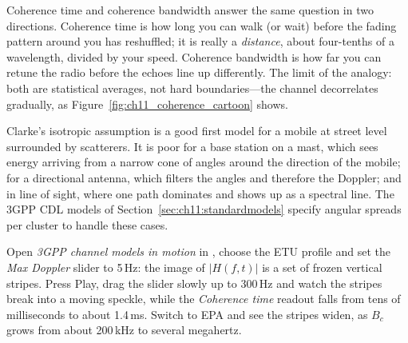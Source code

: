 
\begin{analogy}
Coherence time and coherence bandwidth answer the same question in two directions. Coherence time
is how long you can walk (or wait) before the fading pattern around you has reshuffled; it is
really a \emph{distance}, about four-tenths of a wavelength, divided by your speed. Coherence
bandwidth is how far you can retune the radio before the echoes line up differently. The limit
of the analogy: both are statistical averages, not hard boundaries---the channel decorrelates
gradually, as Figure~\ref{fig:ch11_coherence_cartoon} shows.
\end{analogy}


Clarke's isotropic assumption is a good first model for a mobile at street level surrounded by
scatterers. It is poor for a base station on a mast, which sees energy arriving from a narrow
cone of angles around the direction of the mobile; for a directional antenna, which filters the
angles and therefore the Doppler; and in line of sight, where one path dominates and shows up as a
spectral line. The 3GPP CDL models of Section~\ref{sec:ch11:standardmodels} specify angular
spreads per cluster to handle these cases.


\begin{tryit}
Open \emph{3GPP channel models in motion} in , choose the ETU profile and set
the \emph{Max Doppler} slider to 5\,Hz: the image of $|H(f,t)|$ is a set of frozen vertical stripes.
Press Play, drag the slider slowly up to 300\,Hz and watch the stripes break into a moving speckle,
while the \emph{Coherence time} readout falls from tens of milliseconds to about 1.4\,ms. Switch to EPA and see the stripes widen,
as $B_c$ grows from about 200\,kHz to several megahertz.
\end{tryit}

